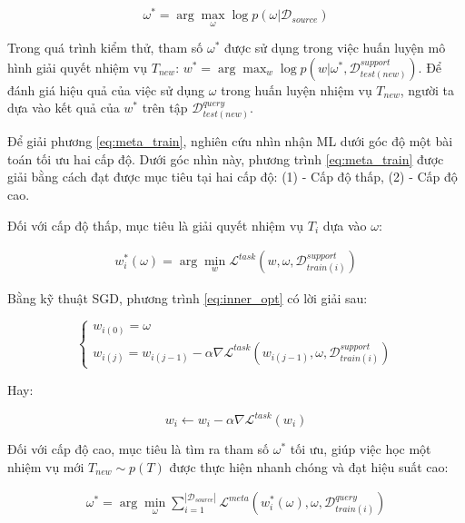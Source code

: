 \begin{dmath}
    \label{eq:meta_train}
    \omega^* = \arg \max_{\omega} \log{p(\omega|\mathcal{D}_{source})}
\end{dmath}

Trong quá trình kiểm thử, tham số $\omega^*$ được sử dụng trong việc huấn luyện mô hình giải quyết nhiệm vụ $T_{new}$: $w^* = \arg \max_{w} \log{p(w|\omega^*, \mathcal{D}_{test(new)}^{support})}$. Để đánh giá hiệu quả của việc sử dụng $\omega$ trong huấn luyện nhiệm vụ $T_{new}$, người ta dựa vào kết quả của $w^*$ trên tập $\mathcal{D}_{test(new)}^{query}$.

Để giải phương \ref{eq:meta_train}, nghiên cứu \cite{hospedales2020meta} nhìn nhận ML dưới góc độ một bài toán tối ưu hai cấp độ. Dưới góc nhìn này, phương trình \ref{eq:meta_train} được giải bằng cách đạt được mục tiêu tại hai cấp độ: (1) - Cấp độ thấp, (2) - Cấp độ cao.

Đối với cấp độ thấp, mục tiêu là giải quyết nhiệm vụ $T_i$ dựa vào $\omega$:

\begin{eqnarray}
    \label{eq:inner_opt}
    w^*_i(\omega) = \arg \min_{w} \mathcal{L}^{task} \left(w, \omega, \mathcal{D}_{train(i)}^{support}\right)
\end{eqnarray}

Bằng kỹ thuật SGD, phương trình \ref{eq:inner_opt} có lời giải sau:

\begin{equation}
    \label{sol:inner_opt}
    \begin{cases}
        w_{i(0)} = \omega\\
        w_{i(j)} = w_{i(j-1)} - \alpha \nabla \mathcal{L}^{task}\left(w_{i(j-1)}, \omega, \mathcal{D}_{train(i)}^{support}\right)
    \end{cases}
\end{equation}

Hay:

\begin{dmath}
    w_i \leftarrow w_i - \alpha\nabla\mathcal{L}^{task}(w_i)
\end{dmath}

Đối với cấp độ cao, mục tiêu là tìm ra tham số $\omega^*$ tối ưu, giúp việc học một nhiệm vụ mới $T_{new}\sim p(T)$ được thực hiện nhanh chóng và đạt hiệu suất cao:

\begin{eqnarray}
    \label{eq:outer_opt}
    \omega^* = \arg \min_{\omega} \sum_{i=1}^{|\mathcal{D}_{source}|} \mathcal{L}^{meta}\left(w^*_i(\omega), \omega, \mathcal{D}_{train(i)}^{query}\right)
\end{eqnarray}

